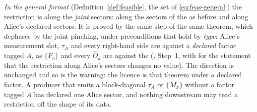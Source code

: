 \begin{remark}
\emph{In the general format} (Definition~\ref{def:feasible}, the set of
\eqref{eq:feas-general}) the restriction is along the \emph{joint} sectors:
along the sectors of the  as before and along Alice's
declared sectors. It is proved by the same step of the same theorem, which
dephases by the joint pinching, under preconditions that hold by
\emph{type}: Alice's measurement slot, $\tau_A$ and every right-hand side are
 against a \emph{declared} factor tagged $A$,
as $\{F_v\}$ and every $\hat O_k$ are against the
 (,
Step~1, with  for the statement that the
restriction along Alice's sectors changes no value). The direction is
unchanged and so is the warning: the licence is that theorem under a declared
factor. A producer that emits a block-diagonal $\tau_A$ or $\{M_x\}$ without
a factor tagged $A$ has declared one Alice sector, and nothing downstream may
read a restriction off the shape of its data.
\end{remark}
